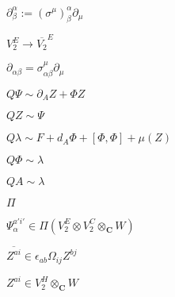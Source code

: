 \begin{preview}
\setcounter{equation}{0}%
\( \partial^{\alpha}_{\beta} := (\sigma^{\mu})_{\beta}^{\alpha} \partial_{\mu} \)
\end{preview}

\begin{preview}
\setcounter{equation}{0}%
\( V_2^E\to \overline{V_2}^{E} \)
\end{preview}

\begin{preview}
\setcounter{equation}{0}%
\( \partial_{\alpha\beta} = \sigma_{\alpha\beta}^{\mu} \partial_{\mu} \)
\end{preview}

\begin{preview}
\setcounter{equation}{0}%
\( Q\Psi \sim \partial_A Z + \Phi Z \)
\end{preview}

\begin{preview}
\setcounter{equation}{0}%
\( QZ \sim \Psi \)
\end{preview}

\begin{preview}
\setcounter{equation}{0}%
\( Q \lambda \sim F + d_A \Phi + [\Phi, \Phi] + \mu(Z)  \)
\end{preview}

\begin{preview}
\setcounter{equation}{0}%
\( Q \Phi \sim \lambda \)
\end{preview}

\begin{preview}
\setcounter{equation}{0}%
\( QA \sim \lambda \)
\end{preview}

\begin{preview}
\setcounter{equation}{0}%
\( \Pi  \)
\end{preview}

\begin{preview}
\setcounter{equation}{0}%
\( \Psi_{\alpha}^{a'i'} \in \Pi ( V_2^E \otimes  V_2^C \otimes _{\mathbf{C}} W) \)
\end{preview}

\begin{preview}
\setcounter{equation}{0}%
\( \overline{Z^{ai}} \in \epsilon_{ab} \Omega_{ij}Z^{bj} \)
\end{preview}

\begin{preview}
\setcounter{equation}{0}%
\( Z^{ai} \in V_2^H \otimes _\mathbf{C} W \)
\end{preview}

